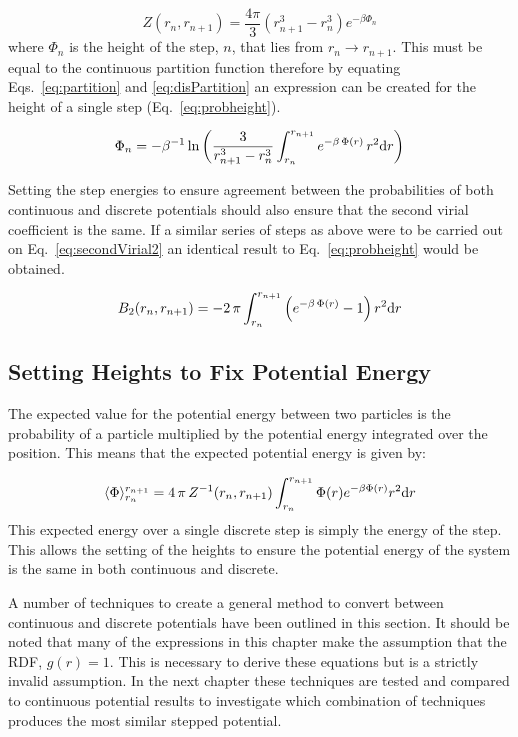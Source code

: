 \documentclass[12pt]{UoAthesis} \usepackage{booktabs}
\begin{document}
\begin{equation}
  Z(r_n, r_{n+1}) = \frac{4\pi}{3}\left(r_{n+1}^3 - r_{n}^3\right)e^{-\beta\Phi_n} 
  \label{eq:disPartition}
\end{equation}
where $\Phi_n$ is the height of the step, $n$, that lies from $r_n
\rightarrow r_{n+1}$. This must be equal to the continuous partition
function therefore by equating Eqs.~\eqref{eq:partition} and
\ref{eq:disPartition} an expression can be created for the height of a
single step (Eq.~\eqref{eq:probheight}).

\begin{equation}
  \label{eq:probheight}
  \Phi_n= -\beta^{-1}\ln{\left(\frac{3}{r_{n+1}^3 - r_{n}^3}
      \int^{r_{n+1}}_{r_n}e^{-\beta\,\Phi(r)}\,r^2{\rm d}r\right)}
\end{equation}

Setting the step energies to ensure agreement between the
probabilities of both continuous and discrete potentials should also
ensure that the second virial coefficient is the same.  If a similar
series of steps as above were to be carried out on
Eq.~\eqref{eq:secondVirial2} an identical result to
Eq.~\eqref{eq:probheight} would be obtained.

\begin{equation}
  \label{eq:secondVirial2}
  B_2(r_n, r_{n+1}) = -2\,\pi \int^{r_{n+1}}_{r_n} \left(e^{-\beta\,\Phi(r)}-1\right)r^2{\rm d}r
\end{equation}
\subsection{Setting Heights to Fix Potential Energy}
The expected value for the potential energy between two particles is
the probability of a particle multiplied by the potential energy
integrated over the position.  This means that the expected potential
energy is given by:

\begin{equation}
  \label{eq:energyheight}
  \langle\Phi\rangle^{r_{n+1}}_{r_n} = 4\,\pi\,Z^{-1}(r_n, r_{n+1})
  \int^{r_{n+1}}_{r_n}\Phi(r)e^{-\beta\Phi(r)}r^2{\rm d}r 
\end{equation}
This expected energy over a single discrete step is simply the energy
of the step.  This allows the setting of the heights to ensure the
potential energy of the system is the same in both continuous and
discrete.

A number of techniques to create a general method to convert between
continuous and discrete potentials have been outlined in this section.
It should be noted that many of the expressions in this chapter make
the assumption that the RDF, $g(r)=1$.  This is necessary to derive
these equations but is a strictly invalid assumption.  In the next
chapter these techniques are tested and compared to continuous
potential results to investigate which combination of techniques
produces the most similar stepped potential.
\end{document}
